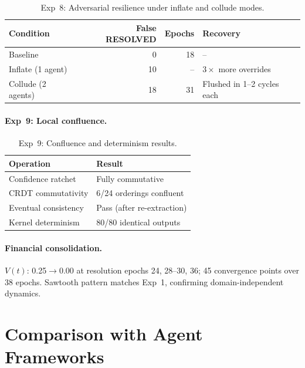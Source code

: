 \documentclass[11pt]{article}
\begin{document}
\begin{table}[H]
\centering
\small
\begin{tabular}{lrrl}
\toprule
\textbf{Condition} & \textbf{False RESOLVED} & \textbf{Epochs} & \textbf{Recovery} \\
\midrule
Baseline & 0 & 18 & -- \\
Inflate (1 agent) & 10 & -- & $3\times$ more overrides \\
Collude (2 agents) & 18 & 31 & Flushed in 1--2 cycles each \\
\bottomrule
\end{tabular}
\caption{Exp~8: Adversarial resilience under inflate and collude modes.}
\end{table}

\paragraph{Exp~9: Local confluence.}

\begin{table}[H]
\centering
\small
\begin{tabular}{ll}
\toprule
\textbf{Operation} & \textbf{Result} \\
\midrule
Confidence ratchet & Fully commutative \\
CRDT commutativity & 6/24 orderings confluent \\
Eventual consistency & Pass (after re-extraction) \\
Kernel determinism & 80/80 identical outputs \\
\bottomrule
\end{tabular}
\caption{Exp~9: Confluence and determinism results.}
\end{table}

\paragraph{Financial consolidation.}
$V(t)$: 0.25$\to$0.00 at resolution epochs 24, 28--30, 36; 45 convergence points over 38 epochs.
Sawtooth pattern matches Exp~1, confirming domain-independent dynamics.

\section{Comparison with Agent Frameworks}
\label{sec:app-comparison}
\end{document}
